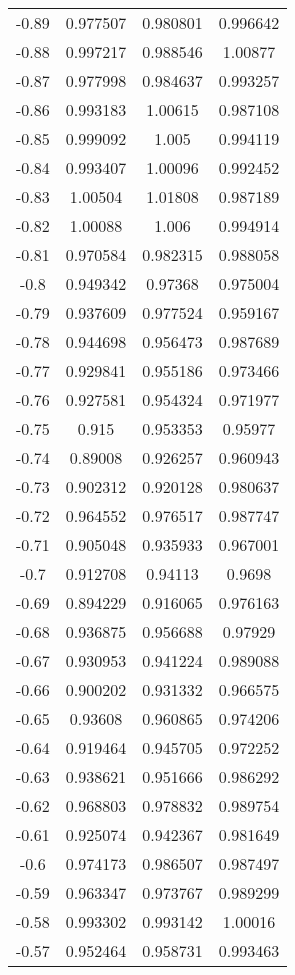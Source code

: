 \begin{table}[h!]
\begin{tabular}{|c|c|c|c|}
-0.89 & 0.977507 & 0.980801 & 0.996642 \\
-0.88 & 0.997217 & 0.988546 & 1.00877 \\
-0.87 & 0.977998 & 0.984637 & 0.993257 \\
-0.86 & 0.993183 & 1.00615 & 0.987108 \\
-0.85 & 0.999092 & 1.005 & 0.994119 \\
-0.84 & 0.993407 & 1.00096 & 0.992452 \\
-0.83 & 1.00504 & 1.01808 & 0.987189 \\
-0.82 & 1.00088 & 1.006 & 0.994914 \\
-0.81 & 0.970584 & 0.982315 & 0.988058 \\
-0.8 & 0.949342 & 0.97368 & 0.975004 \\
-0.79 & 0.937609 & 0.977524 & 0.959167 \\
-0.78 & 0.944698 & 0.956473 & 0.987689 \\
-0.77 & 0.929841 & 0.955186 & 0.973466 \\
-0.76 & 0.927581 & 0.954324 & 0.971977 \\
-0.75 & 0.915 & 0.953353 & 0.95977 \\
-0.74 & 0.89008 & 0.926257 & 0.960943 \\
-0.73 & 0.902312 & 0.920128 & 0.980637 \\
-0.72 & 0.964552 & 0.976517 & 0.987747 \\
-0.71 & 0.905048 & 0.935933 & 0.967001 \\
-0.7 & 0.912708 & 0.94113 & 0.9698 \\
-0.69 & 0.894229 & 0.916065 & 0.976163 \\
-0.68 & 0.936875 & 0.956688 & 0.97929 \\
-0.67 & 0.930953 & 0.941224 & 0.989088 \\
-0.66 & 0.900202 & 0.931332 & 0.966575 \\
-0.65 & 0.93608 & 0.960865 & 0.974206 \\
-0.64 & 0.919464 & 0.945705 & 0.972252 \\
-0.63 & 0.938621 & 0.951666 & 0.986292 \\
-0.62 & 0.968803 & 0.978832 & 0.989754 \\
-0.61 & 0.925074 & 0.942367 & 0.981649 \\
-0.6 & 0.974173 & 0.986507 & 0.987497 \\
-0.59 & 0.963347 & 0.973767 & 0.989299 \\
-0.58 & 0.993302 & 0.993142 & 1.00016 \\
-0.57 & 0.952464 & 0.958731 & 0.993463 \\

\end{tabular}
\end{table}

